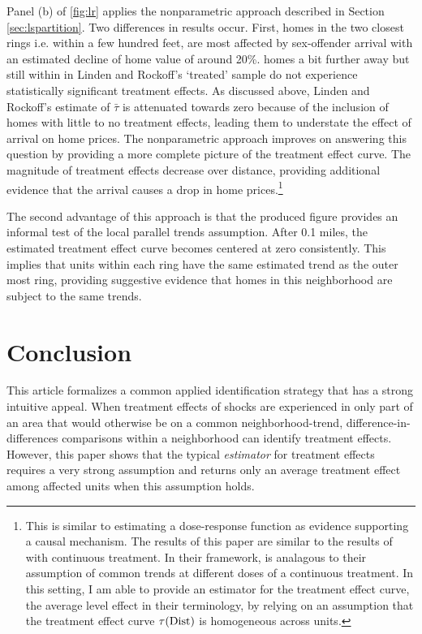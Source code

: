 Panel (b) of \autoref{fig:lr} applies the nonparametric approach described in Section \ref{sec:lspartition}. Two differences in results occur. First, homes in the two closest rings i.e. within a few hundred feet, are most affected by sex-offender arrival with an estimated decline of home value of around 20\%. homes a bit further away but still within in Linden and Rockoff's `treated' sample do not experience statistically significant treatment effects. As discussed above, Linden and Rockoff's estimate of $\bar{\tau}$ is attenuated towards zero because of the inclusion of homes with little to no treatment effects, leading them to understate the effect of arrival on home prices. The nonparametric approach improves on answering this question by providing a more complete picture of the treatment effect curve. The magnitude of treatment effects decrease over distance, providing additional evidence that the arrival causes a drop in home prices.\footnote{This is similar to estimating a dose-response function as evidence supporting a causal mechanism. The results of this paper are similar to the results of \citet{Callaway_Goodman-Bacon_SantAnna_2021} with continuous treatment. In their framework,  is analagous to their assumption of common trends at different doses of a continuous treatment. In this setting, I am able to provide an estimator for the treatment effect curve, the average level effect in their terminology, by relying on an assumption that the treatment effect curve $\tau(\text{Dist})$ is homogeneous across units.} 

The second advantage of this approach is that the produced figure provides an informal test of the local parallel trends assumption. After 0.1 miles, the estimated treatment effect curve becomes centered at zero consistently. This implies that units within each ring have the same estimated trend as the outer most ring, providing suggestive evidence that homes in this neighborhood are subject to the same trends. 

\section{Conclusion}

This article formalizes a common applied identification strategy that has a strong intuitive appeal. When treatment effects of shocks are experienced in only part of an area that would otherwise be on a common neighborhood-trend, difference-in-differences comparisons within a neighborhood can identify treatment effects. However, this paper shows that the typical \textit{estimator} for treatment effects requires a very strong assumption and returns only an average treatment effect among affected units when this assumption holds. 

